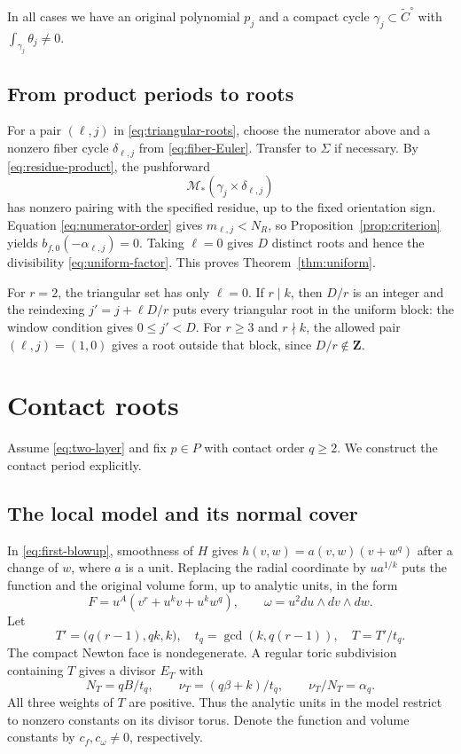 \documentclass[11pt]{article}
\numberwithin{equation}{section}
\theoremstyle{definition}
\theoremstyle{remark}
\newcommand{\ZZ}{\mathbf Z}
\newcommand{\bfzero}{b_{f,0}}
\begin{document}
In all cases we have an original polynomial $p_j$ and
a compact cycle $\gamma_j\subset\widetilde C^\circ$ with
$\int_{\gamma_j}\theta_j\ne0$.

\subsection{From product periods to roots}

For a pair $(\ell,j)$ in \eqref{eq:triangular-roots}, choose
the numerator above and a nonzero fiber cycle $\delta_{\ell,j}$
from \eqref{eq:fiber-Euler}. Transfer to $\Sigma$ if
necessary. By \eqref{eq:residue-product}, the pushforward
\[
 \mathcal M_*(\gamma_j\times\delta_{\ell,j})
\]
has nonzero pairing with the specified residue, up to the
fixed orientation sign. Equation \eqref{eq:numerator-order}
gives $m_{\ell,j}<N_R$, so
Proposition~\ref{prop:criterion} yields
$\bfzero(-\alpha_{\ell,j})=0$.
Taking $\ell=0$ gives $D$ distinct roots and hence the
divisibility \eqref{eq:uniform-factor}. This proves
Theorem~\ref{thm:uniform}.

For $r=2$, the triangular set has only $\ell=0$. If
$r\mid k$, then $D/r$ is an integer and the reindexing
$j'=j+\ell D/r$ puts every triangular root in the uniform
block: the window condition gives $0\le j'<D$.
For $r\ge3$ and $r\nmid k$, the allowed pair $(\ell,j)=(1,0)$
gives a root outside that block, since $D/r\notin\ZZ$.

\section{Contact roots}\label{sec:contact}

Assume \eqref{eq:two-layer} and fix $p\in P$ with contact
order $q\ge2$. We construct the contact period explicitly.

\subsection{The local model and its normal cover}

In \eqref{eq:first-blowup}, smoothness of $H$ gives
$h(v,w)=a(v,w)(v+w^q)$ after a change of $w$, where $a$
is a unit. Replacing the radial coordinate by $u a^{1/k}$
puts the function and the original volume form, up to
analytic units, in the form
\begin{equation}\label{eq:contact-model}
 F=u^A(v^r+u^kv+u^kw^q),\qquad
 \omega=u^2du\wedge dv\wedge dw.
\end{equation}
Let
\begin{equation}\label{eq:T-data}
 T'=\bigl(q(r-1),qk,k\bigr),\quad
 t_q=\gcd(k,q(r-1)),\quad T=T'/t_q.
\end{equation}
The compact Newton face is nondegenerate. A regular toric
subdivision containing $T$ gives a divisor $E_T$
with
\begin{equation}\label{eq:T-numerics}
 N_T=qB/t_q,\qquad \nu_T=(q\beta+k)/t_q,\qquad
 \nu_T/N_T=\alpha_q.
\end{equation}
All three weights of $T$ are positive. Thus the analytic
units in the model restrict to nonzero constants on its
divisor torus. Denote the function and volume constants by
$c_f,c_\omega\ne0$, respectively.
\end{document}

